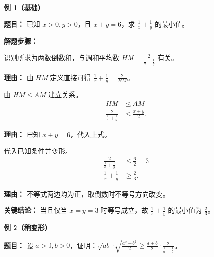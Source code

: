 \begin{examplebox}
\textbf{\textcolor{CExample}{例 1（基础）}}

\textbf{\textcolor{CExample}{题目：}} 已知 $x>0, y>0$，且 $x+y=6$，求 $\frac{1}{x}+\frac{1}{y}$ 的最小值。

\textbf{\textcolor{CExample}{解题步骤：}}
\begin{description}[style=nextline, leftmargin=2.8em, labelsep=0.5em, itemsep=0.45em]
    \item[\textbf{第一步（联系调和平均）：}] 识别所求为两数倒数和，与调和平均数 $HM = \frac{2}{\frac{1}{x}+\frac{1}{y}}$ 有关。
    \par\textbf{理由：} 由 $HM$ 定义直接可得 $\frac{1}{x}+\frac{1}{y} = \frac{2}{HM}$。
    \item[\textbf{第二步（利用不等式链）：}] 由 $HM \le AM$ 建立关系。
    \[
    \begin{aligned}
    HM &\le AM \\
    \frac{2}{\frac{1}{x}+\frac{1}{y}} &\le \frac{x+y}{2}.
    \end{aligned}
    \]
    \par\textbf{理由：} 已知 $x+y=6$，代入上式。
    \item[\textbf{第三步（求解最小值）：}] 代入已知条件并变形。
    \[
    \begin{aligned}
    \frac{2}{\frac{1}{x}+\frac{1}{y}} &\le \frac{6}{2} = 3 \\
    \frac{1}{x}+\frac{1}{y} &\ge \frac{2}{3}.
    \end{aligned}
    \]
    \par\textbf{理由：} 不等式两边均为正，取倒数时不等号方向改变。
\end{description}

\textbf{\textcolor{CExample}{关键结论：}} 当且仅当 $x=y=3$ 时等号成立，故 $\frac{1}{x}+\frac{1}{y}$ 的最小值为 $\frac{2}{3}$。

\medskip
\textbf{\textcolor{CExample}{例 2（稍变形）}}

\textbf{\textcolor{CExample}{题目：}} 设 $a>0, b>0$，证明：$\sqrt{ab} \cdot \sqrt{\frac{a^2+b^2}{2}} \ge \frac{a+b}{2} \cdot \frac{2}{\frac{1}{a}+\frac{1}{b}}$。


\end{examplebox}
